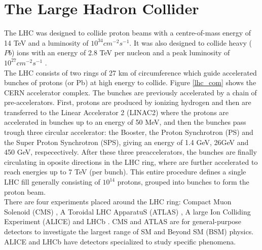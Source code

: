 \section{The Large Hadron Collider}

The LHC was designed to collide proton beams with a centre-of-mass energy of 14  TeV and a luminosity of $10^{34}cm^{-2}s^{-1}$. It was also designed to collide heavy ($Pb$) ions with an energy of 2.8 TeV per nucleon and a peak luminosity of $10^{27}cm^{-2}s^{-1}$ \cite{lhcmachine2008}.\\
The LHC consists of two rings of 27 km of circumference which guide accelerated bunches of protons (or Pb) at high energy to collide. Figure \ref{lhc_com} shows the CERN accelerator complex. The bunches are previously accelerated by a chain of pre-accelerators. First, protons are produced by ionizing hydrogen and then are transferred to the Linear Accelerator 2 (LINAC2) where the protons are accelerated in bunches up to an energy of 50 MeV, and then the bunches pass trough three circular accelerator: the Booster, the Proton Synchrotron (PS) and the Super Proton Synchrotron (SPS), giving an energy of 1.4 GeV, 26GeV and 450 GeV, respecectively. After these three preaccelerators, the bunches are finally circulating in oposite directions in the LHC ring, where are further accelerated to reach energies up to 7 TeV (per bunch). This entire procedure defines a single LHC fill generally consisting of $10^{14}$ protons, grouped into bunches to form the proton beam.\\
There are four experiments placed around the LHC ring: Compact Muon Solenoid (CMS) \cite{CMS_Exp_2008}, A Toroidal LHC ApparatuS (ATLAS) \cite{Atlas_Exp_2008}, A large Ion Colliding Experiment (ALICE) \cite{ALICE_Exp_2008} and LHCb \cite{LHCb_Exp_2008}. CMS and ATLAS are for general-purpose detectors to investigate the largest range of SM and Beyond SM (BSM) physics. ALICE and LHCb have detectors specialized to study specific phenomena.

